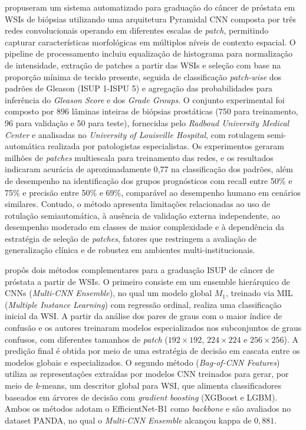  propuseram um sistema automatizado para graduação do câncer de próstata em WSIs de biópsias utilizando uma arquitetura Pyramidal CNN composta por três redes convolucionais operando em diferentes escalas de \textit{patch}, permitindo capturar características morfológicas em múltiplos níveis de contexto espacial. O pipeline de processamento incluiu equalização de histograma para normalização de intensidade, extração de patches a partir das WSIs e seleção com base na proporção mínima de tecido presente, seguida de classificação \textit{patch-wise} dos padrões de Gleason (ISUP 1-ISPU 5) e agregação das probabilidades para inferência do \textit{Gleason Score} e dos \textit{Grade Groups}. O conjunto experimental foi composto por 896 lâminas inteiras de biópsias prostáticas (750 para treinamento, 96 para validação e 50 para teste), fornecidas pelo \textit{Radboud University Medical Center} e analisadas no \textit{University of Louisville Hospital}, com rotulagem semi-automática realizada por patologistas especialistas. Os experimentos geraram milhões de \textit{patches} multiescala para treinamento das redes, e os resultados indicaram acurácia de aproximadamente 0,77 na classificação dos padrões, além de desempenho na identificação dos grupos prognósticos com recall entre 50\% e 75\% e precisão entre 50\% e 69\%, comparável ao desempenho humano em cenários similares. Contudo, o método apresenta limitações relacionadas ao uso de rotulação semiautomática, à ausência de validação externa independente, ao desempenho moderado em classes de maior complexidade e à dependência da estratégia de seleção de \textit{patches}, fatores que restringem a avaliação de generalização clínica e de robustez em ambientes multi-institucionais.

 propôs dois métodos complementares para a graduação ISUP de câncer de próstata a partir de WSIs. O primeiro consiste em um ensemble hierárquico de CNNs (\textit{Multi-CNN Ensemble}), no qual um modelo global $M_1$, treinado via MIL (\textit{Multiple Instance Learning}) com regressão ordinal, realiza uma classificação inicial da WSI. A partir da análise dos pares de graus com o maior índice de confusão e os autores treinaram modelos especializados nos subconjuntos de graus confusos, com diferentes tamanhos de \textit{patch} ($192\times192$, $224\times224$ e $256\times256$). A predição final é obtida por meio de uma estratégia de decisão em cascata entre os modelos globais e especializados. O segundo método (\textit{Bag-of-CNN Features}) utiliza as representações extraídas por modelos CNN treinados para gerar, por meio de \textit{k}-means, um descritor global para WSI, que alimenta classificadores baseados em árvores de decisão com \textit{gradient boosting} (XGBoost e LGBM). Ambos os métodos adotam o EfficientNet-B1 como \textit{backbone} e são avaliados no dataset PANDA, no qual o \textit{Multi-CNN Ensemble} alcançou kappa de $0{,}881$.

